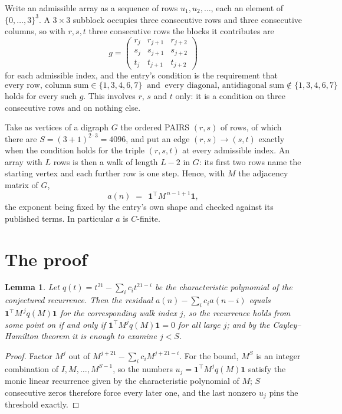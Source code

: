 \documentclass[11pt,a4paper]{article}
\theoremstyle{plain}
\newtheorem{lemma}[theorem]{Lemma}
\theoremstyle{definition}
\begin{document}
Write an admissible array as a sequence of rows $u_1,u_2,\dots$, each an element of
$\{0,\dots,3\}^{3}$. A $3\times3$ subblock occupies three consecutive rows and
three consecutive columns, so with $r,s,t$ three consecutive rows the blocks it
contributes are
\[
g=\begin{pmatrix}r_j&r_{j+1}&r_{j+2}\\ s_j&s_{j+1}&s_{j+2}\\ t_j&t_{j+1}&t_{j+2}\end{pmatrix}
\]
for each admissible index, and the entry's condition is the requirement that
\[
\text{every row, column sum} \in \{1,3,4,6,7\}\ \text{ and }\ \text{every diagonal, antidiagonal sum} \notin \{1,3,4,6,7\}
\]
holds for every such $g$. This involves $r$, $s$ and $t$ only: it is a condition on
three consecutive rows and on nothing else.

Take as vertices of a digraph $G$ the ordered PAIRS $(r,s)$ of rows, of which there are
$S=(3+1)^{2\cdot3}=4096$, and put an edge $(r,s)\to(s,t)$ exactly when the condition
holds for the triple $(r,s,t)$ at every admissible index. An array with $L$ rows is then a
walk of length $L-2$ in $G$: its first two rows name the starting vertex and each further
row is one step. Hence, with $M$ the adjacency matrix of $G$,
\[
a(n)\;=\;\,\mathbf{1}^{\!\top}M^{\,n-1+1}\mathbf{1},
\]
the exponent being fixed by the entry's own shape and checked against its published terms.
In particular $a$ is $C$-finite.

\section{The proof}

\begin{lemma}\label{lem:crit}
Let $q(t)=t^{21}-\sum_i c_it^{21-i}$ be the characteristic polynomial of the
conjectured recurrence. Then the residual $a(n)-\sum_ic_ia(n-i)$ equals
$\mathbf{1}^{\!\top}M^{\,j}q(M)\mathbf{1}$ for the corresponding walk index
$j$, so the recurrence holds from some point on if and only if
$\mathbf{1}^{\!\top}M^{j}q(M)\mathbf{1}=0$ for all large $j$; and by the
Cayley--Hamilton theorem it is enough to examine $j<S$.
\end{lemma}

\begin{proof}
Factor $M^{j}$ out of $M^{j+21}-\sum_ic_iM^{j+21-i}$. For the bound, $M^{S}$
is an integer combination of $I,M,\dots,M^{S-1}$, so the numbers
$u_j=\mathbf{1}^{\!\top}M^{j}q(M)\mathbf{1}$ satisfy the monic linear recurrence given by
the characteristic polynomial of $M$; $S$ consecutive zeros therefore force every later one,
and the last nonzero $u_j$ pins the threshold exactly.
\end{proof}
\end{document}
